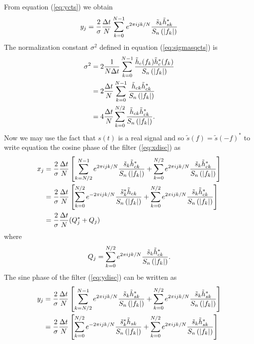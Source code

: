 From equation
(\ref{eq:ycts}) we obtain
\begin{equation}
\label{eq:ydisc}
y_j = \frac{2}{\sigma} \frac{\Delta t}{N} \sum_{k=0}^{N-1} e^{2\pi ijk/N} 
\frac{\tilde{s}_k \tilde{h}_{sk}^\ast} {S_n\left(\left|f_{k}\right|\right)}
\end{equation}
The normalization constant $\sigma^2$ defined in equation
(\ref{eq:sigmasqcts}) is
\begin{equation}
\begin{split}
\label{eq:sigmasqdisc}
\sigma^2 &= 2 \frac{1}{N\Delta t} \sum_{k=0}^{N-1}
\frac{\tilde{h}_{c}(f_k)\tilde{h}_{c}^\ast(f_k)}{S_n\left(\left|f_{k}\right|\right)}  \\
&=
2 \frac{\Delta t}{N} \sum_{k=0}^{N-1}
\frac{\tilde{h}_{ck}\tilde{h}_{ck}^\ast}{S_n\left(\left|f_{k}\right|\right)} \\
&=
4 \frac{\Delta t}{N} \sum_{k=0}^{N/2}
\frac{\tilde{h}_{ck}\tilde{h}_{ck}^\ast}{S_n\left(\left|f_{k}\right|\right)}.
\end{split}
\end{equation}
Now we may use the fact that $s(t)$ is a real signal and so $\tilde{s}(f) = 
\tilde{s}(-f)^\ast$ to write equation the cosine phase of the filter 
(\ref{eq:xdisc}) as
\begin{equation}
\begin{split}
x_j &= 
\frac{2}{\sigma}\frac{\Delta t}{N}
\left[
  \sum_{k=N/2}^{N-1} e^{2\pi ijk/N} 
  \frac{\tilde{s}_k \tilde{h}_{ck}^\ast}{S_n\left(\left|f_{k}\right|\right)}
  +
  \sum_{k=0}^{N/2} e^{2\pi ijk/N} 
  \frac{\tilde{s}_k \tilde{h}_{ck}^\ast}{S_n\left(\left|f_{k}\right|\right)}
\right] \\
&= \frac{2}{\sigma}\frac{\Delta t}{N}
\left[
  \sum_{k=0}^{N/2} e^{-2\pi ijk/N} 
  \frac{\tilde{s}_k^\ast \tilde{h}_{ck}}{S_n\left(\left|f_{k}\right|\right)}
  +
  \sum_{k=0}^{N/2} e^{2\pi ijk/N} 
  \frac{\tilde{s}_k \tilde{h}_{ck}^\ast}{S_n\left(\left|f_{k}\right|\right)}
\right] \\
&= \frac{2}{\sigma}\frac{\Delta t}{N}(Q_j^\ast + Q_j)
\end{split}
\end{equation}
where
\begin{equation}
\label{eq:Qdef}
Q_j = \sum_{k=0}^{N/2} e^{2\pi ijk/N} 
  \frac{\tilde{s}_k \tilde{h}_{ck}^\ast}{S_n\left(\left|f_{k}\right|\right)}.
\end{equation}
The sine phase of the filter (\ref{eq:ydisc}) can be written as
\begin{equation}
\begin{split}
\label{eq:yinter}
y_j &=
\frac{2}{\sigma}\frac{\Delta t}{N}
\left[
  \sum_{k=N/2}^{N-1} e^{2\pi ijk/N} 
  \frac{\tilde{s}_k \tilde{h}_{sk}^\ast}{S_n\left(\left|f_{k}\right|\right)}
  +
  \sum_{k=0}^{N/2} e^{2\pi ijk/N} 
  \frac{\tilde{s}_k \tilde{h}_{sk}^\ast}{S_n\left(\left|f_{k}\right|\right)}
\right] \\
&= 
\frac{2}{\sigma}\frac{\Delta t}{N}
\left[
  \sum_{k=0}^{N/2} e^{-2\pi ijk/N} 
  \frac{\tilde{s}_k^\ast \tilde{h}_{sk}}{S_n\left(\left|f_{k}\right|\right)}
  +
  \sum_{k=0}^{N/2} e^{2\pi ijk/N} 
  \frac{\tilde{s}_k \tilde{h}_{sk}^\ast}{S_n\left(\left|f_{k}\right|\right)}
\right]
\end{split}
\end{equation}
